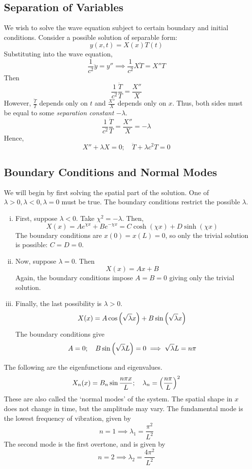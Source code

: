 \subsection{Separation of Variables}
We wish to solve the wave equation subject to certain boundary and initial conditions.
Consider a possible solution of separable form:
\[
	y(x,t) = X(x) T(t)
\]
Substituting into the wave equation,
\[
	\frac{1}{c^2} \ddot y = y'' \implies \frac{1}{c^2} X \ddot T = X'' T
\]
Then
\[
	\frac{1}{c^2}\frac{\ddot T}{T} = \frac{X''}{X}
\]
However, \( \frac{\ddot T}{T} \) depends only on \( t \) and \( \frac{X''}{X} \) depends only on \( x \).
Thus, both sides must be equal to some \textit{separation constant} \( -\lambda \).
\[
	\frac{1}{c^2}\frac{\ddot T}{T} = \frac{X''}{X} = -\lambda
\]
Hence,
\[
	X'' + \lambda X = 0;\quad \ddot T + \lambda c^2 T = 0
\]

\subsection{Boundary Conditions and Normal Modes}
We will begin by first solving the spatial part of the solution.
One of \( \lambda > 0, \lambda < 0, \lambda = 0 \) must be true.
The boundary conditions restrict the possible \( \lambda \).
\begin{enumerate}[(i)]
	\item First, suppose \( \lambda < 0 \).
	      Take \( \chi^2 = -\lambda \).
	      Then,
	      \[
		      X(x) = Ae^{\chi x} + Be^{-\chi x} = C \cosh (\chi x) + D \sinh (\chi x)
	      \]
	      The boundary conditions are \( x(0) = x(L) = 0 \), so only the trivial solution is possible: \( C = D = 0 \).
	\item Now, suppose \( \lambda = 0 \).
	      Then
	      \[
		      X(x) = Ax + B
	      \]
	      Again, the boundary conditions impose \( A = B = 0 \) giving only the trivial solution.
	\item Finally, the last possibility is \( \lambda > 0 \).
	      \[
		      X(x) = A \cos \qty(\sqrt{\lambda} x) + B \sin \qty(\sqrt{\lambda} x)
	      \]
	      The boundary conditions give
	      \[
		      A = 0;\quad B \sin \qty(\sqrt{\lambda} L) = 0 \implies \sqrt{\lambda} L = n \pi
	      \]
\end{enumerate}
\noindent The following are the eigenfunctions and eigenvalues.
\[
	X_n(x) = B_n \sin \frac{n \pi x}{L};\quad \lambda_n = \qty(\frac{n \pi}{L})^2
\]
These are also called the `normal modes' of the system.
The spatial shape in \( x \) does not change in time, but the amplitude may vary.
The fundamental mode is the lowest frequency of vibration, given by
\[
	n = 1 \implies \lambda_1 = \frac{\pi^2}{L^2}
\]
The second mode is the first overtone, and is given by
\[
	n = 2 \implies \lambda_2 = \frac{4\pi^2}{L^2}
\]

